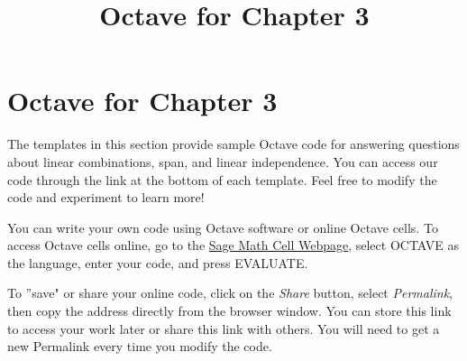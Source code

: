 \documentclass{ximera}
\title{Octave for Chapter 3} \license{CC BY-NC-SA 4.0}
\begin{document}
\begin{abstract}
\end{abstract}
\maketitle

\section*{Octave for Chapter 3}
The templates in this section provide sample Octave code for answering questions about linear combinations, span, and linear independence. You can access our code through the link at the bottom of each template.  Feel free to modify the code and experiment to learn more!  

You can write your own code using Octave software or online Octave cells.  To access Octave cells online, go to the \href{https://sagecell.sagemath.org/}{Sage Math Cell Webpage}, select OCTAVE as the language, enter your code, and press EVALUATE.  

To ''save" or share your online code, click on the \emph{Share} button, select \emph{Permalink}, then copy the address directly from the browser window.  You can store this link to access your work later or share this link with others.  You will need to get a new Permalink every time you modify the code.
\end{document}
